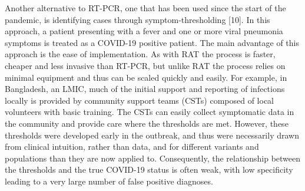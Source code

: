 \documentclass[]{elsarticle} %
\begin{document}
Another alternative to RT-PCR, one that has been used since the start of the pandemic, is identifying cases through symptom-thresholding {[}10{]}.
In this approach, a patient presenting with a fever and one or more viral pneumonia symptoms is treated as a COVID-19 positive patient.
The main advantage of this approach is the ease of implementation.
As with RAT the process is faster, cheaper and less invasive than RT-PCR, but unlike RAT the process relies on minimal equipment and thus can be scaled quickly and easily.
For example, in Bangladesh, an LMIC, much of the initial support and reporting of infections locally is provided by community support teams (CSTs) composed of local volunteers with basic training.
The CSTs can easily collect symptomatic data in the community and provide care where the thresholds are met.
However, these thresholds were developed early in the outbreak, and thus were necessarily drawn from clinical intuition, rather than data, and for different variants and populations than they are now applied to.
Consequently, the relationship between the thresholds and the true COVID-19 status is often weak, with low specificity leading to a very large number of false positive diagnoses.
\end{document}

